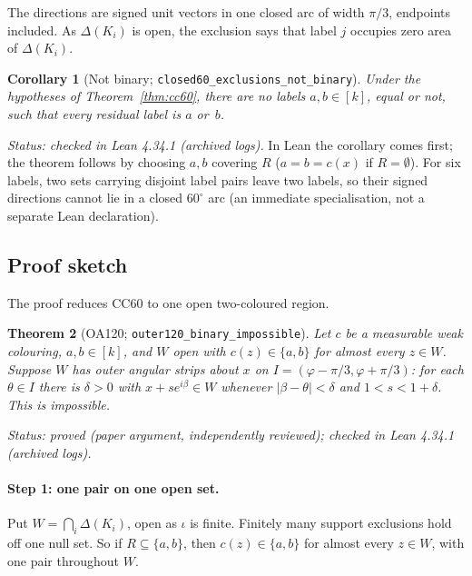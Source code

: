 \documentclass[11pt]{article}
\newtheorem{theorem}{Theorem}[section]
\newtheorem{corollary}[theorem]{Corollary}
\theoremstyle{definition}
\theoremstyle{remark}
\begin{document}
The directions are signed unit vectors in one closed arc of width $\pi/3$,
endpoints included. As $\Delta(K_i)$ is open, the exclusion says that
label $j$ occupies zero area of $\Delta(K_i)$.

\begin{corollary}[Not binary; \texttt{closed60\_\allowbreak{}exclusions\_\allowbreak{}not\_\allowbreak{}binary}]\label{cor:notbinary}
Under the hypotheses of Theorem~\ref{thm:cc60}, there are no labels
$a,b\in[k]$, equal or not, such that every residual label is $a$ or~$b$.
\end{corollary}
\noindent\emph{Status: checked in Lean 4.34.1 (archived logs).} In Lean the
corollary comes first; the theorem follows by choosing $a,b$ covering $R$
($a=b=c(x)$ if $R=\emptyset$). For six labels, two sets carrying disjoint
label pairs leave two labels, so their signed directions cannot lie in a
closed $60^\circ$ arc (an immediate specialisation, not a separate Lean
declaration).

\subsection{Proof sketch}

The proof reduces CC60 to one open two-coloured region.

\begin{theorem}[OA120; \texttt{outer120\_\allowbreak{}binary\_\allowbreak{}impossible}]\label{thm:oa120}
Let $c$ be a measurable weak colouring, $a,b\in[k]$, and $W$ open with
$c(z)\in\{a,b\}$ for almost every $z\in W$. Suppose $W$ has \emph{outer
angular strips} about $x$ on $I=(\varphi-\pi/3,\varphi+\pi/3)$: for each
$\theta\in I$ there is $\delta>0$ with $x+se^{i\beta}\in W$ whenever
$|\beta-\theta|<\delta$ and $1<s<1+\delta$. This is impossible.
\end{theorem}
\noindent\emph{Status: proved (paper argument, independently reviewed);
checked in Lean 4.34.1 (archived logs).}

\paragraph{Step 1: one pair on one open set.} Put $W=\bigcap_i\Delta(K_i)$,
open as $\iota$ is finite. Finitely many support exclusions hold off one
null set. So if $R\subseteq\{a,b\}$, then $c(z)\in\{a,b\}$ for almost every
$z\in W$, with one pair throughout $W$.
\end{document}
